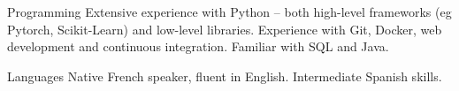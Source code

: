 

\begin{cvskills}

  \cvskill
    {Programming}
    {Extensive experience with Python – both high-level frameworks (eg Pytorch, Scikit-Learn) and low-level libraries.}
  \cvskill
    {}
    {Experience with Git, Docker, web development and continuous integration. Familiar with SQL and Java.}



  \cvskill
    {Languages} %
    {Native French speaker, fluent in English. Intermediate Spanish skills.} %

\end{cvskills}
